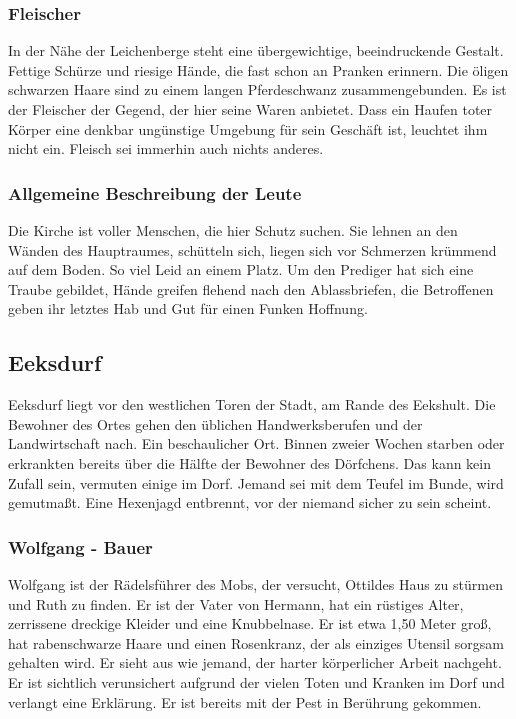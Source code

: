 \subsubsection*{Fleischer}
\label{Fleischer}

In der Nähe der Leichenberge steht eine übergewichtige, beeindruckende Gestalt. Fettige Schürze und riesige Hände, die fast schon an Pranken erinnern. Die öligen schwarzen Haare sind zu einem langen Pferdeschwanz zusammengebunden. Es ist der Fleischer der Gegend, der hier seine Waren anbietet. Dass ein Haufen toter Körper eine denkbar ungünstige Umgebung für sein Geschäft ist, leuchtet ihm nicht ein. Fleisch sei immerhin auch nichts anderes.

\subsubsection*{Allgemeine Beschreibung der Leute}
\label{Leute}

Die Kirche ist voller Menschen, die hier Schutz suchen. Sie lehnen an den Wänden des Hauptraumes, schütteln sich, liegen sich vor Schmerzen krümmend auf dem Boden. So viel Leid an einem Platz. Um den Prediger hat sich eine Traube gebildet, Hände greifen flehend nach den Ablassbriefen, die Betroffenen geben ihr letztes Hab und Gut für einen Funken Hoffnung.


\subsection{Eeksdurf}

Eeksdurf liegt vor den westlichen Toren der Stadt, am Rande des Eekshult. Die Bewohner des Ortes gehen den üblichen Handwerksberufen und der Landwirtschaft nach. Ein beschaulicher Ort. Binnen zweier Wochen starben oder erkrankten bereits über die Hälfte der Bewohner des Dörfchens. Das kann kein Zufall sein, vermuten einige im Dorf. Jemand sei mit dem Teufel im Bunde, wird gemutmaßt. Eine Hexenjagd entbrennt, vor der niemand sicher zu sein scheint.

\subsubsection*{Wolfgang - Bauer}
\label{Wolfgang}

Wolfgang ist der Rädelsführer des Mobs, der versucht, Ottildes Haus zu stürmen und Ruth zu finden. Er ist der Vater von Hermann, hat ein rüstiges Alter, zerrissene dreckige Kleider und eine Knubbelnase. Er ist etwa 1,50 Meter groß, hat rabenschwarze Haare und einen Rosenkranz, der als einziges Utensil sorgsam gehalten wird. Er sieht aus wie jemand, der harter körperlicher Arbeit nachgeht. Er ist sichtlich verunsichert aufgrund der vielen Toten und Kranken im Dorf und verlangt eine Erklärung. Er ist bereits mit der Pest in Berührung gekommen.


